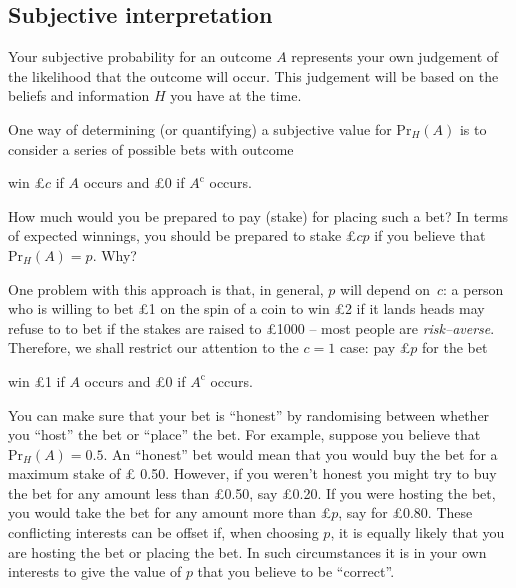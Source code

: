 \subsection*{Subjective interpretation}
Your subjective probability for an outcome $A$ represents your own
judgement of the likelihood that the outcome will occur. This
judgement will be based on the beliefs and information $H$ you have
at the time.

One way of determining (or quantifying) a subjective value for
$\text{Pr}_H(A)$ is to consider a series of possible bets with outcome

win \pounds $c$ if $A$ occurs and \pounds 0 if $A^{\mathrm{c}}$ occurs.

How much would you be prepared to pay (stake) for placing such a bet?
In terms of expected winnings, you should be prepared to stake \pounds $cp$
if you believe that $\text{Pr}_H(A)=p$.  Why? 


 





One problem with this approach is that, in general, $p$ will depend
on~$c$: a person who is willing to bet
\pounds 1 on the spin of a coin to win \pounds 2 if it lands heads may
refuse to to bet if the stakes are raised to \pounds 1000 -- most
people are \textit{risk--averse}. Therefore, we shall restrict our attention to
the $c=1$ case: pay \pounds $p$ for the bet

win \pounds 1 if $A$ occurs and \pounds 0 if $A^{\mathrm{c}}$ occurs.


You can make sure that your bet is ``honest'' by randomising between
whether you ``host'' the bet or ``place'' the bet. For example,
suppose you believe that $\text{Pr}_H(A)=0.5$. An ``honest'' bet would mean
that you would buy the bet for a maximum stake of \pounds
0.50. However, if you weren't honest you might try to buy the bet for
any amount less than \pounds 0.50, say \pounds 0.20. If you were
hosting the bet, you would take the bet for any amount more than
\pounds $p$, say for \pounds 0.80. These conflicting interests can be
offset if, when choosing $p$, it is equally likely that you are
hosting the bet or placing the bet. In such circumstances it is in
your own interests to give the value of $p$ that you believe to be
``correct''.

